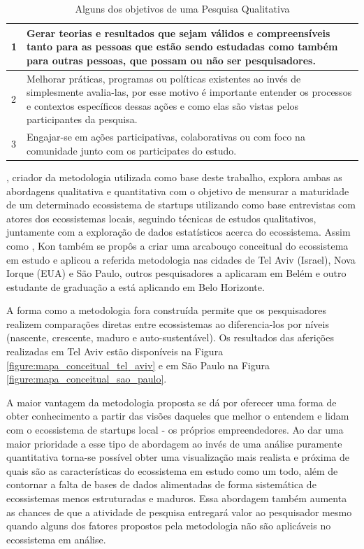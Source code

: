 \begin{table}[!htb]
	\centering
	\begin{tabular}{ | p{3cm} | p{12cm} | }
		\hline
		1 & Gerar teorias e resultados que sejam válidos e compreensíveis tanto para as pessoas que estão sendo estudadas como também para outras pessoas, que possam ou não ser pesquisadores. \\ \hline
		2 & Melhorar práticas, programas ou políticas existentes ao invés de simplesmente avalia-las, por esse motivo é importante entender os processos e contextos específicos dessas ações e como elas são vistas pelos participantes da pesquisa. \\ \hline
		3 & Engajar-se em ações participativas, colaborativas ou com foco na comunidade junto com os participates do estudo. \\ \hline
	\end{tabular}
	\caption{Alguns dos objetivos de uma Pesquisa Qualitativa}
	\label{table:pontos_fortes_segundo_maxwell}
\end{table}

, criador da metodologia utilizada como base deste trabalho, explora ambas as abordagens qualitativa e quantitativa com o objetivo de mensurar a maturidade de um determinado ecossistema de startups utilizando como base entrevistas com atores dos ecossistemas locais, seguindo técnicas de estudos qualitativos, juntamente com a exploração de dados estatísticos acerca do ecossistema. Assim como , Kon também se propôs a criar uma arcabouço conceitual do ecossistema em estudo e aplicou a referida metodologia nas cidades de Tel Aviv (Israel), Nova Iorque (EUA) e São Paulo, outros pesquisadores a aplicaram em Belém e outro estudante de graduação a está aplicando em Belo Horizonte. 

A forma como a metodologia fora construída permite que os pesquisadores realizem comparações diretas entre ecossistemas ao diferencia-los por níveis (nascente, crescente, maduro e auto-sustentável). Os resultados das aferições realizadas em Tel Aviv estão disponíveis na Figura \ref{figure:mapa_conceitual_tel_aviv} e em São Paulo na Figura \ref{figure:mapa_conceitual_sao_paulo}.

A maior vantagem da metodologia proposta se dá por oferecer uma forma de obter conhecimento a partir das visões daqueles que melhor o entendem e lidam com o ecossistema de startups local - os próprios empreendedores. Ao dar uma maior prioridade a esse tipo de abordagem ao invés de uma análise puramente quantitativa torna-se possível obter uma visualização mais realista e próxima de quais são as características do ecossistema em estudo como um todo, além de contornar a falta de bases de dados alimentadas de forma sistemática de ecossistemas menos estruturadas e maduros. Essa abordagem também aumenta as chances de que a atividade de pesquisa entregará valor ao pesquisador mesmo quando alguns dos fatores propostos pela metodologia não são aplicáveis no ecossistema em análise.

